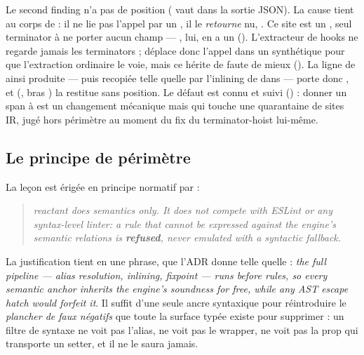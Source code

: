 \begin{remarque}
Le second finding n'a pas de position (\og {} \fg{} vaut  dans la sortie JSON). La cause tient au corps de  : il ne lie pas l'appel par un , il le \emph{retourne} nu, . Ce site est un , seul terminator à ne porter aucun champ  --- , lui, en a un (). L'extracteur de hooks ne regarde jamais les terminators ;  déplace donc l'appel dans un  synthétique pour que l'extraction ordinaire le voie, mais ce  hérite de  faute de mieux (). La ligne de  ainsi produite --- puis recopiée telle quelle par l'inlining de  dans  --- porte donc , et  (, bras ) la restitue sans position. Le défaut est connu et suivi () : donner un span à  est un changement mécanique mais qui touche une quarantaine de sites IR, jugé hors périmètre au moment du fix du terminator-hoist lui-même.
\end{remarque}

\subsection{Le principe de périmètre}

La leçon est érigée en principe normatif par  :

\begin{quote}\small
\og \emph{reactant does semantics only. It does not compete with ESLint or any syntax-level linter: a rule that cannot be expressed against the engine's semantic relations is \textbf{refused}, never emulated with a syntactic fallback.}\fg{}
\end{quote}

La justification tient en une phrase, que l'ADR donne telle quelle : \og \emph{the full pipeline --- alias resolution, inlining, fixpoint --- runs before rules, so every semantic anchor inherits the engine's soundness for free, while any AST escape hatch would forfeit it}\fg{}. Il suffit d'une seule ancre syntaxique pour réintroduire le \emph{plancher de faux négatifs} que toute la surface typée existe pour supprimer : un filtre de syntaxe ne voit pas l'alias, ne voit pas le wrapper, ne voit pas la prop qui transporte un setter, et il ne le saura jamais.

